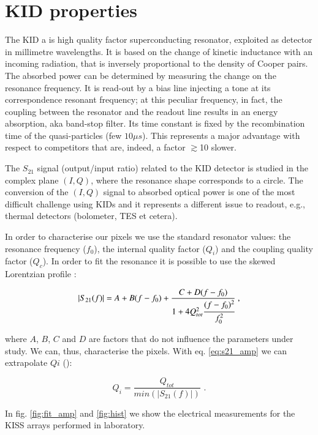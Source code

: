 \documentclass[twocolumn,traditabstract]{aa}\\
\begin{document}
\section{KID properties}
\label{sec:kid}

The KID a is high quality factor superconducting resonator, exploited as detector in millimetre wavelengths. It is based on the change of kinetic inductance with an incoming radiation, that is inversely proportional to the density of Cooper pairs. The absorbed power can be determined by measuring the change on the resonance frequency.  It is read-out by a bias line injecting a tone at its correspondence resonant frequency; at this peculiar frequency, in fact, the coupling between the resonator and the readout line results in an energy absorption, aka band-stop filter. Its time constant is fixed by the recombination time of the quasi-particles (few $10 \mu s$). This represents a major advantage with respect to competitors that are, indeed, a factor $\gtrsim$10 slower.

The $S_{21}$ signal (output/input ratio) related to the KID detector is studied in the complex plane $(I,Q)$, where the resonance shape corresponds to a circle.
The conversion of the $(I,Q)$ signal to absorbed optical power is one of the most difficult challenge using KIDs and it represents a different issue to readout, e.g., thermal detectors (bolometer, TES et cetera).

In order to characterise our pixels we use the standard resonator values: the resonance frequency ($f_0$), the internal quality factor ($Q_i$) and the coupling quality factor ($Q_c$). In order to fit the resonance it is possible to use the skewed Lorentzian profile \cite{Gao}:

\begin{equation}
\left|S_{21}(f)\right|= A+B(f-f_0)+\frac{C+D(f-f_0)}{1+4Q_{tot}^2\cfrac{(f-f_0)^2}{f_0^2}} \text{ ,}
\label{eq:s21_amp}
\end{equation}

\noindent where $A$, $B$, $C$ and $D$ are factors that do not influence the parameters under study. We can, thus, characterise the pixels. With eq. \ref{eq:s21_amp} we can extrapolate $Qi$ (\cite{Gao}):

\begin{equation}
Q_i =\frac{Q_{tot}}{min(\left|S_{21}(f)\right|)}	\text{ .}
\end{equation} 

In fig. \ref{fig:fit_amp} and \ref{fig:hist} we show the electrical measurements for the KISS arrays performed in laboratory.
\end{document}
